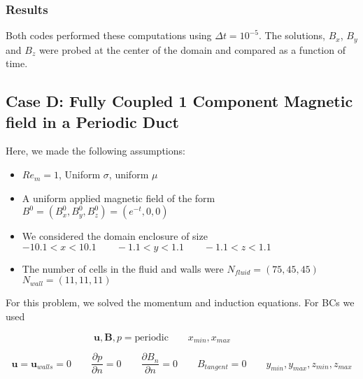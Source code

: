 \documentclass[11pt]{article}
\newcommand{\figS}{22.1em}
\newcommand{\figH}{\figS}
\newcommand{\figW}{\figS}
\begin{document}
\subsubsection{Results}
Both codes performed these computations using $\Delta t = 10^{-5}$. The solutions, $B_x$, $B_y$ and $B_z$ were probed at the center of the domain and compared as a function of time.

\begin{figure}[H]
 \centering
   \caption[Optional ]{}
\end{figure}

\begin{figure}[H]
 \centering
   \caption[Optional ]{}
\end{figure}

\subsection{Case D: Fully Coupled 1 Component Magnetic field in a Periodic Duct}

Here, we made the following assumptions:

\begin{itemize}
\item $Re_m = 1$, Uniform $\sigma$, uniform $\mu$
\item A uniform applied magnetic field of the form $B^0 = (B_x^0,B_y^0,B_z^0) = (e^{-t},0,0)$
\item We considered the domain enclosure of size $-10.1 < x < 10.1 \qquad -1.1 < y < 1.1 \qquad -1.1 < z < 1.1$
\item The number of cells in the fluid and walls were $N_{fluid} = (75,45,45)$ \qquad $N_{wall} = (11,11,11)$
\end{itemize}

For this problem, we solved the momentum and induction equations. For BCs we used

\begin{equation}
	\pmb{u},
	\pmb{B},
	p = \text{periodic}
	\qquad
	x_{min},x_{max}
	\qquad \qquad
\end{equation}

\begin{equation}
	\pmb{u} = \pmb{u}_{walls} = 0
	\qquad
	\frac{\partial p}{\partial n} = 0
	\qquad
	\frac{\partial B_{n}}{\partial n} = 0
	\qquad
	B_{tangent} = 0
	\qquad
	y_{min},y_{max},
	z_{min},z_{max}
\end{equation}
\end{document}
